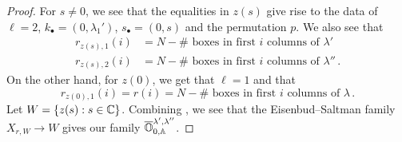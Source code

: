 \documentclass{article} %
\begin{document}
\begin{proof}
For $ s \ne 0$, we see that the equalities in $ z(s) $ give rise to the data of 
\(\ell =2\), \(k_\bullet = (0,\lambda_1')\), \(s_\bullet = (0,s)\) and the permutation $p$.
We also see that
\begin{equation} 
\label{eq:rcols}
    \begin{split}
            r_{z(s), 1}(i) &=  N - \#\text{~boxes in first $i$ columns of }\lambda' \\
            r_{z(s), 2}(i) &=  N - \#\text{~boxes in first $i$ columns of }\lambda'' \,. 
    \end{split}
\end{equation}
On the other hand, for $z(0)$, we get that $ \ell = 1$ and that 
\begin{equation} 
\label{eq:rcol2}
    r_{z(0),1}(i) = 
    r(i) = N - \#\text{~boxes in first $i$ columns of }\lambda\,. 
\end{equation}
% 
% 
% 
Let $ W = \{ z(s) : s \in \mathbb C \}$. Combining ,
we see that the Eisenbud--Saltman family $ X_{r, W} \rightarrow W $ gives our family $ \overline{\mathbb O}^{\lambda', \lambda''}_{0, \mathbb A}$.
\end{proof}
% 
% 
\end{document}

